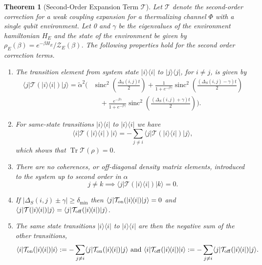\documentclass{article}
\newtheorem{theorem}{Theorem}
\newcommand{\on}{\rm on}
\newcommand{\off}{\rm off}
\newcommand{\ket}[1]{|#1\rangle}
\newcommand{\bra}[1]{\langle #1|}
\newcommand{\ketbra}[2]{| #1\rangle\! \langle #2|}
\DeclareMathOperator{\Tr}{Tr}
\newcommand{\partfun}{\mathcal{Z}}
\DeclareMathOperator{\sinc}{sinc}
\begin{document}
\begin{theorem}[Second-Order Expansion Term $\mathcal{T}$] \label{thm:second_order_transition}
Let $\mathcal{T}$ denote the second-order correction for a weak coupling expansion for a thermalizing channel $\Phi$ with a single qubit environment. Let 0 and $\gamma$ be the eigenvalues of the environment hamiltonian $H_E$ and the state of the environment be given by $\rho_E(\beta) = e^{-\beta H_E} / \partfun_E(\beta)$. The following properties hold for the second order correction terms.
\begin{enumerate}
    \item 
The transition element from system state $\ketbra{i}{i}$ to $\ketbra{j}{j}$, for $i \neq j$, is given by
\begin{align}
    \bra{j}\mathcal{T}(\ketbra{i}{i}) \ket{j} = \widetilde{\alpha}^2 \Biggr(& \sinc^2 \left( \frac{\Delta_S(i,j)t}{2} \right) + \frac{1}{1 + e^{-\beta \gamma}} \sinc^2 \left( \frac{(\Delta_S(i,j) - \gamma)t}{2} \right) \nonumber\\
    &\quad+  \frac{e^{-\beta \gamma}}{1 + e^{-\beta \gamma}} \sinc^2 \left( \frac{(\Delta_S(i,j) + \gamma)t}{2} \right) \Biggr). \label{eq:transition_terms_total}
\end{align}
\item For same-state transitions $\ketbra{i}{i}$ to $\ketbra{i}{i}$ we have
\begin{equation}
    \bra{i}\mathcal{T}(\ketbra{i}{i})\ket{i} = - \sum_{j \neq i} \bra{j} \mathcal{T}(\ketbra{i}{i}) \ket{j},
\end{equation}
which shows that $\Tr \mathcal{T}(\rho) = 0$. 
\item There are no coherences, or off-diagonal density matrix elements, introduced to the system up to second order in $\alpha$
\begin{equation}
    j \neq k \implies \bra{j} \mathcal{T}(\ketbra{i}{i}) \ket{k} = 0.
\end{equation}
\item If $|\Delta_S(i, j) \pm \gamma| \geq \delta_{\min}$ then $\bra{j}\mathcal{T}_{\on}(\ketbra{i}{i}) \ket{j} = 0$ and $\bra{j}\mathcal{T}(\ketbra{i}{i})\ket{j} = \bra{j}\mathcal{T}_{\off}(\ketbra{i}{i})\ket{j}$.
\item The same state transitions $\ketbra{i}{i}$ to $\ketbra{i}{i}$ are then the negative sum of the other transitions,
\begin{equation}
    \bra{i} \mathcal{T}_{\on}(\ketbra{i}{i}) \ket{i} := - \sum_{j \neq i} \bra{j} \mathcal{T}_{\on}(\ketbra{i}{i}) \ket{j} \text{ and } \bra{i} \mathcal{T}_{\off}(\ketbra{i}{i}) \ket{i} := - \sum_{j \neq i} \bra{j} \mathcal{T}_{\off}(\ketbra{i}{i}) \ket{j}.
\end{equation} 
\end{enumerate}
\end{theorem}
\end{document}
